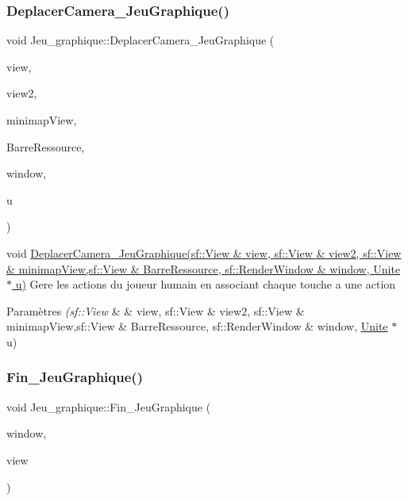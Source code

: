 \subsubsection{\texorpdfstring{Deplacer\+Camera\+\_\+\+Jeu\+Graphique()}{DeplacerCamera\_JeuGraphique()}}
{\footnotesize\ttfamily void Jeu\+\_\+graphique\+::\+Deplacer\+Camera\+\_\+\+Jeu\+Graphique (\begin{DoxyParamCaption}\item[{sf\+::\+View \&}]{view,  }\item[{sf\+::\+View \&}]{view2,  }\item[{sf\+::\+View \&}]{minimap\+View,  }\item[{sf\+::\+View \&}]{Barre\+Ressource,  }\item[{sf\+::\+Render\+Window \&}]{window,  }\item[{\hyperlink{classUnite}{Unite} $\ast$}]{u }\end{DoxyParamCaption})}



void \hyperlink{classJeu__graphique_abbcc5e26b8ac9f79716367883bfdb556}{Deplacer\+Camera\+\_\+\+Jeu\+Graphique(sf\+::\+View \& view, sf\+::\+View \& view2, sf\+::\+View \& minimap\+View,sf\+::\+View \& Barre\+Ressource, sf\+::\+Render\+Window \& window, Unite $\ast$ u)} Gere les actions du joueur humain en associant chaque touche a une action 


\begin{DoxyParams}{Paramètres}
{\em (sf\+::\+View} & \& view, sf\+::\+View \& view2, sf\+::\+View \& minimap\+View,sf\+::\+View \& Barre\+Ressource, sf\+::\+Render\+Window \& window, \hyperlink{classUnite}{Unite} $\ast$ u) \\
\hline
\end{DoxyParams}
\mbox{\label{classJeu__graphique_a7c0810ad56f4394dc8ddb77779d0b625}} 
\subsubsection{\texorpdfstring{Fin\+\_\+\+Jeu\+Graphique()}{Fin\_JeuGraphique()}}
{\footnotesize\ttfamily void Jeu\+\_\+graphique\+::\+Fin\+\_\+\+Jeu\+Graphique (\begin{DoxyParamCaption}\item[{sf\+::\+Render\+Window \&}]{window,  }\item[{sf\+::\+View \&}]{view }\end{DoxyParamCaption})}



